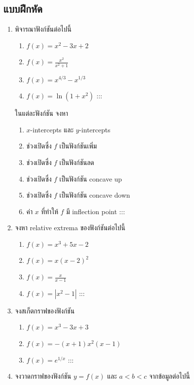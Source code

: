 \documentclass[
]{book}
\theoremstyle{definition}
\theoremstyle{definition}
\theoremstyle{definition}
\theoremstyle{definition}
\theoremstyle{remark}
\begin{document}
\subsection{แบบฝึกหัด}\label{uxe41uxe1auxe1auxe1duxe01uxe2buxe14-4}

\begin{enumerate}
\def\labelenumi{\arabic{enumi}.}
\item
  พิจารณาฟังก์ชันต่อไปนี้

  \begin{enumerate}
  \def\labelenumii{\arabic{enumii}.}
  \item
    \(\displaystyle f(x) = x^2-3x+2\)
  \item
    \(\displaystyle f(x) = \frac{x^2}{x^2+1}\)
  \item
    \(\displaystyle f(x) = x^{4/3} - x^{1/3}\)
  \item
    \(\displaystyle f(x) = \ln(1+x^2)\)
    :::
  \end{enumerate}

  ในแต่ละฟังก์ชัน จงหา

  \begin{enumerate}
  \def\labelenumii{\arabic{enumii}.}
  \item
    \(x\)-intercepts และ \(y\)-intercepts
  \item
    ช่วงเปิดซึ่ง \(f\) เป็นฟังก์ชันเพิ่ม
  \item
    ช่วงเปิดซึ่ง \(f\) เป็นฟังก์ชันลด
  \item
    ช่วงเปิดซึ่ง \(f\) เป็นฟังก์ชัน concave up
  \item
    ช่วงเปิดซึ่ง \(f\) เป็นฟังก์ชัน concave down
  \item
    ค่า \(x\) ที่ทำให้ \(f\) มี inflection point
    :::
  \end{enumerate}
\item
  จงหา relative extrema ของฟังก์ชันต่อไปนี้

  \begin{enumerate}
  \def\labelenumii{\arabic{enumii}.}
  \item
    \(\displaystyle f(x) = x^3+5x-2\)
  \item
    \(\displaystyle f(x) = x(x-2)^2\)
  \item
    \(\displaystyle f(x) = \frac{x}{x-1}\)
  \item
    \(\displaystyle f(x) = |x^2-1|\)
    :::
  \end{enumerate}
\item
  จงสเก็ตกราฟของฟังก์ชัน

  \begin{enumerate}
  \def\labelenumii{\arabic{enumii}.}
  \item
    \(f(x) = x^3-3x+3\)
  \item
    \(f(x) = -(x+1)x^2(x-1)\)
  \item
    \(f(x) = e^{1/x}\)
    :::
  \end{enumerate}
\item
  จงวาดกราฟของฟังก์ชัน \(y=f(x)\) และ \(a<b<c\) จากข้อมูลต่อไปนี้


\end{enumerate}
\end{document}
